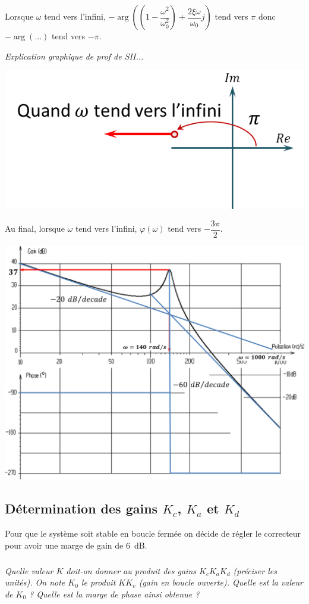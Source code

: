 \documentclass[10pt,fleqn]{article} %
\begin{document}
\begin{multicols}{2}
\begin{corrige}
Lorsque $\omega$ tend vers l'infini,
$-\arg  \left( \left( 1 - \dfrac{\omega^2}{\omega_0^2}\right) + \dfrac{2\xi\omega}{\omega_0} j \right)$ tend vers $\pi$ donc $-\arg(...)$ tend vers $-\pi$.

\textit{Explication graphique de prof de SII...}
\begin{center}
\includegraphics[width=.6\linewidth]{images/cor_02}
\end{center}

Au final, lorsque $\omega$ tend vers l'infini, $\varphi(\omega)$ tend vers $-\dfrac{3\pi}{2}$.

\end{corrige} \else \fi

\begin{center}
\includegraphics[width=.8\linewidth]{images/cor_03}
\end{center}


\subsection*{Détermination des gains $K_c$, $K_a$ et $K_d$}
\ifprof
\else
Pour que le système soit stable en boucle fermée on décide de régler le correcteur pour avoir une marge de gain de \SI{6}{dB}.
\fi

\subparagraph{}\textit{Quelle valeur $K$ doit-on donner au produit des gains $K_c K_a K_d$ (préciser les unités).
On note $K_0$ le produit $KK_v$ (gain en boucle ouverte). Quelle est la valeur de $K_0$ ?
Quelle est la marge de phase ainsi obtenue ?}



\end{multicols}
\end{document}
